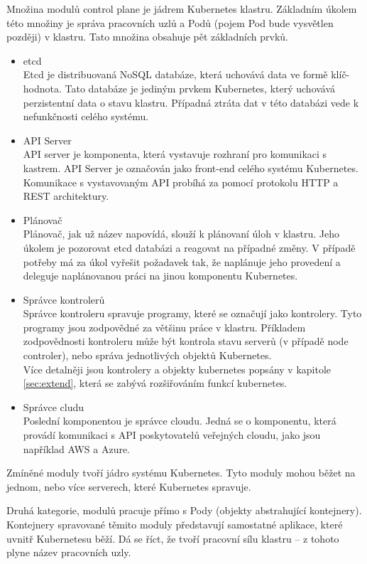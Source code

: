 Množina modulů control plane je jádrem Kubernetes klastru. Základním úkolem této množiny je správa pracovních uzlů a Podů (pojem Pod bude vysvětlen později) v klastru. \cite{thekubernetesauthors_2022_kubernetes} Tato množina obsahuje pět základních prvků.
\begin{itemize}
    \item etcd\\
    Etcd je distribuovaná NoSQL databáze, která uchovává data  ve formě klíč-hodnota. Tato databáze je jediným prvkem Kubernetes, který uchovává perzistentní data o stavu klastru. Případná ztráta dat v této databázi vede k nefunkčnosti celého systému.
    \item API Server\\
    API server je komponenta, která vystavuje rozhraní pro komunikaci s kastrem. API Server je označován jako front-end celého systému Kubernetes. Komunikace s vystavovaným API probíhá za pomocí protokolu HTTP a REST architektury. 
    \item Plánovač\\
    Plánovač, jak už název napovídá, slouží k plánovaní úloh v klastru. Jeho úkolem je pozorovat etcd databázi a reagovat na případné změny. V případě potřeby má za úkol vyřešit požadavek tak, že naplánuje jeho provedení a deleguje naplánovanou práci na jinou komponentu Kubernetes.  
    \item Správce kontrolerů\\
    Správce kontroleru spravuje programy, které se označují jako kontrolery. Tyto programy jsou zodpovědné za většinu práce v klastru. Příkladem zodpovědnosti kontroleru může být kontrola stavu serverů (v případě node controler), nebo správa jednotlivých objektů Kubernetes.\\
    Více detalněji jsou kontrolery a objekty kubernetes popsány v kapitole \ref{sec:extend}, která se zabývá rozšiřováním funkcí kubernetes. 
    \item Správce cludu\\
    Poslední komponentou je správce cloudu. Jedná se o komponentu, která provádí komunikaci s API poskytovatelů veřejných cloudu, jako jsou například AWS a Azure. 
\end{itemize}
Zmíněné moduly tvoří jádro systému Kubernetes. Tyto moduly mohou běžet na jednom, nebo více serverech, které Kubernetes spravuje.

Druhá kategorie, modulů pracuje přímo s Pody (objekty abstrahující kontejnery). Kontejnery spravované těmito moduly představují samostatné aplikace, které uvnitř Kubernetesu běží. Dá se říct, že tvoří pracovní sílu klastru -- z tohoto plyne název pracovních uzly.

